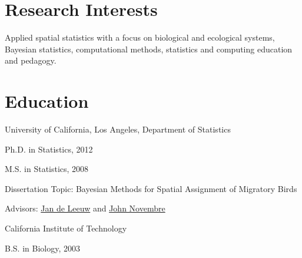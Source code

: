 \documentclass[margin,line]{res}
\begin{document}
\address{
{\small 204 Old Chemistry Building $\bullet$ Dept of Statistical Science, Duke University \hspace{2.7cm} \href{mailto:colin.rundel@stat.duke.edu}{colin.rundel@stat.duke.edu}}
}
\address{
{\small 2256 JCMB $\bullet$ School of Mathematics, University of Edinbrugh \hspace{5.15cm} \href{mailto:colin.rundel@ed.ac.uk}{colin.rundel@ed.ac.uk}}
}

\begin{resume}

%

\vspace{3mm}

\section{\sc Research Interests}
Applied spatial statistics with a focus on biological and ecological systems, Bayesian statistics, computational methods, statistics and computing education and pedagogy.

\vspace{4mm}

%

\section{\sc Education}
University of California, Los Angeles, Department of Statistics
\vspace{1mm}
\begin{list1}
\item[] Ph.D. in Statistics,  2012
\item[] M.S. in Statistics,  2008
\vspace{1mm}
\item[] Dissertation Topic:  Bayesian Methods for Spatial Assignment of Migratory Birds
\item[] Advisors:  \href{http://www.cuddyvalley.org}{Jan de Leeuw} and \href{http://www.eeb.ucla.edu/Faculty/Novembre/}{John Novembre}
\end{list1}

\vspace{-0.13cm}
California Institute of Technology
\vspace{1mm}
\begin{list1}
\item[] B.S. in Biology, 2003
\end{list1}


\end{resume}
\end{document}
